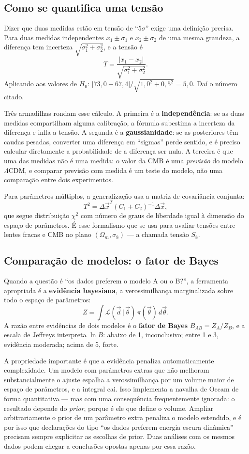 \documentclass[11pt,a4paper]{article}
\begin{document}
\subsection*{Como se quantifica uma tensão}

Dizer que duas medidas estão em tensão de ``$5\sigma$'' exige uma definição precisa. Para duas medidas independentes $x_1\pm\sigma_1$ e $x_2\pm\sigma_2$ de uma mesma grandeza, a diferença tem incerteza $\sqrt{\sigma_1^{2}+\sigma_2^{2}}$, e a tensão é
\[
T=\frac{|x_1-x_2|}{\sqrt{\sigma_1^{2}+\sigma_2^{2}}}.
\]
Aplicando aos valores de $H_0$: $|73{,}0-67{,}4|/\sqrt{1{,}0^{2}+0{,}5^{2}}=5{,}0$. Daí o número citado.

Três armadilhas rondam esse cálculo. A primeira é a \textbf{independência}: se as duas medidas compartilham alguma calibração, a fórmula subestima a incerteza da diferença e infla a tensão. A segunda é a \textbf{gaussianidade}: se as posteriores têm caudas pesadas, converter uma diferença em ``sigmas'' perde sentido, e é preciso calcular diretamente a probabilidade de a diferença ser nula. A terceira é que uma das medidas não é uma medida: o valor da CMB é uma \emph{previsão} do modelo $\Lambda$CDM, e comparar previsão com medida é um teste do modelo, não uma comparação entre dois experimentos.

Para parâmetros múltiplos, a generalização usa a matriz de covariância conjunta:
\[
T^{2}=\Delta\vec{x}^{T}\left(C_1+C_2\right)^{-1}\Delta\vec{x},
\]
que segue distribuição $\chi^{2}$ com número de graus de liberdade igual à dimensão do espaço de parâmetros. É esse formalismo que se usa para avaliar tensões entre lentes fracas e CMB no plano $(\Omega_m,\sigma_8)$ --- a chamada tensão $S_8$.

\subsection*{Comparação de modelos: o fator de Bayes}

Quando a questão é ``os dados preferem o modelo A ou o B?'', a ferramenta apropriada é a \textbf{evidência bayesiana}, a verossimilhança marginalizada sobre todo o espaço de parâmetros:
\[
Z=\int\mathcal{L}(\vec{d}\,|\,\vec{\theta})\,\pi(\vec{\theta})\,d\vec{\theta}.
\]
A razão entre evidências de dois modelos é o \textbf{fator de Bayes} $B_{AB}=Z_A/Z_B$, e a escala de Jeffreys interpreta $\ln B$: abaixo de 1, inconclusivo; entre 1 e 3, evidência moderada; acima de 5, forte.

A propriedade importante é que a evidência penaliza automaticamente complexidade. Um modelo com parâmetros extras que não melhoram substancialmente o ajuste espalha a verossimilhança por um volume maior de espaço de parâmetros, e a integral cai. Isso implementa a navalha de Occam de forma quantitativa --- mas com uma consequência frequentemente ignorada: o resultado depende do \emph{prior}, porque é ele que define o volume. Ampliar arbitrariamente o prior de um parâmetro extra penaliza o modelo estendido, e é por isso que declarações do tipo ``os dados preferem energia escura dinâmica'' precisam sempre explicitar as escolhas de prior. Duas análises com os mesmos dados podem chegar a conclusões opostas apenas por essa razão.
\end{document}
